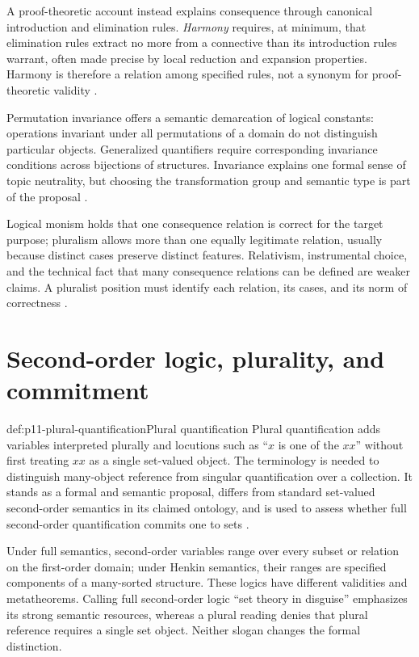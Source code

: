 A proof-theoretic account instead explains consequence through canonical
introduction and elimination rules. \emph{Harmony} requires, at minimum, that
elimination rules extract no more from a connective than its introduction
rules warrant, often made precise by local reduction and expansion properties.
Harmony is therefore a relation among specified rules, not a synonym for
proof-theoretic validity \cite{Dummett1991,Prawitz1965}.

Permutation invariance offers a semantic demarcation of logical constants:
operations invariant under all permutations of a domain do not distinguish
particular objects. Generalized quantifiers require corresponding invariance
conditions across bijections of structures. Invariance explains one formal
sense of topic neutrality, but choosing the transformation group and semantic
type is part of the proposal \cite{Sher1991}.

Logical monism holds that one consequence relation is correct for the target
purpose; pluralism allows more than one equally legitimate relation, usually
because distinct cases preserve distinct features. Relativism, instrumental
choice, and the technical fact that many consequence relations can be defined
are weaker claims. A pluralist position must identify each relation, its cases,
and its norm of correctness \cite{BeallRestall2006}.

\section{Second-order logic, plurality, and commitment}
\label{sec:p11-ontology}

\begin{hbdefinition}{def:p11-plural-quantification}{Plural quantification}
Plural quantification adds variables interpreted plurally and locutions such
as ``\(x\) is one of the \(xx\)'' without first treating \(xx\) as a single
set-valued object. The terminology is needed to distinguish many-object
reference from singular quantification over a collection. It stands as a
formal and semantic proposal, differs from standard set-valued second-order
semantics in its claimed ontology, and is used to assess whether full
second-order quantification commits one to sets \cite{Boolos1984,Shapiro1991}.
\end{hbdefinition}

Under full semantics, second-order variables range over every subset or
relation on the first-order domain; under Henkin semantics, their ranges are
specified components of a many-sorted structure. These logics have different
validities and metatheorems. Calling full second-order logic ``set theory in
disguise'' emphasizes its strong semantic resources, whereas a plural reading
denies that plural reference requires a single set object. Neither slogan
changes the formal distinction.

